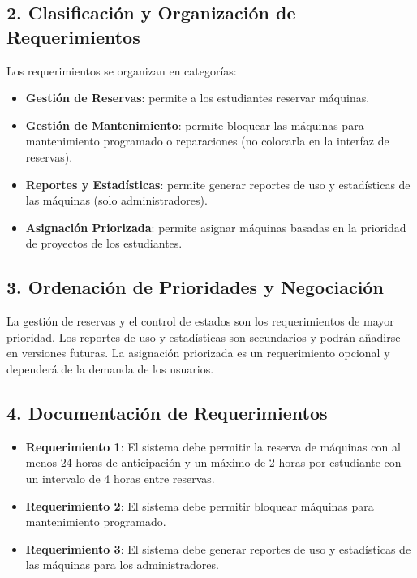 \documentclass[12pt]{article}
\begin{document}
\subsection{2. Clasificación y Organización de Requerimientos}
Los requerimientos se organizan en categorías:
\begin{itemize}
    \item \textbf{Gestión de Reservas}: permite a los estudiantes reservar máquinas.
    \item \textbf{Gestión de Mantenimiento}: permite bloquear las máquinas para mantenimiento programado o reparaciones (no colocarla en la interfaz de reservas).
    \item \textbf{Reportes y Estadísticas}: permite generar reportes de uso y estadísticas de las máquinas (solo administradores).
    \item \textbf{Asignación Priorizada}: permite asignar máquinas basadas en la prioridad de proyectos de los estudiantes.
\end{itemize}

\subsection{3. Ordenación de Prioridades y Negociación}
La gestión de reservas y el control de estados son los requerimientos de mayor prioridad. Los reportes de uso y estadísticas son secundarios y podrán añadirse en versiones futuras. La asignación priorizada es un requerimiento opcional y dependerá de la demanda de los usuarios.

\subsection{4. Documentación de Requerimientos}
\begin{itemize}
    \item \textbf{Requerimiento 1}: El sistema debe permitir la reserva de máquinas con al menos 24 horas de anticipación y un máximo de 2 horas por estudiante con un intervalo de 4 horas entre reservas.
    \item \textbf{Requerimiento 2}: El sistema debe permitir bloquear máquinas para mantenimiento programado.
    \item \textbf{Requerimiento 3}: El sistema debe generar reportes de uso y estadísticas de las máquinas para los administradores.
\end{itemize}
\end{document}
